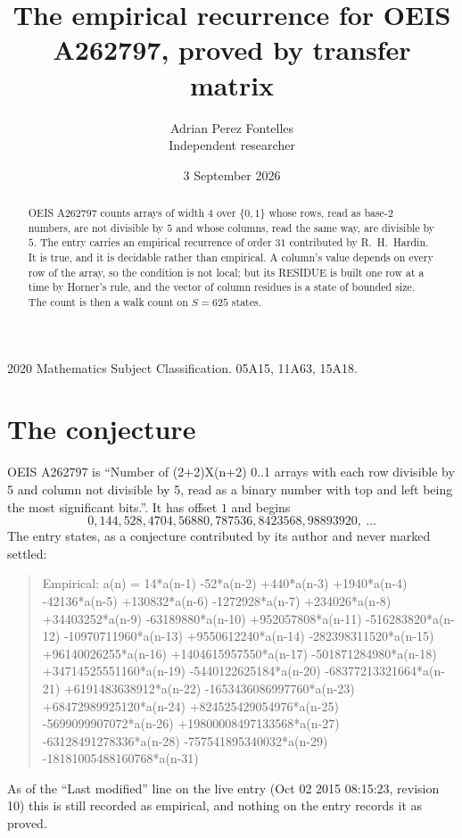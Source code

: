 \documentclass[11pt,a4paper]{article}
\title{The empirical recurrence for OEIS A262797, proved by transfer matrix}
\author{Adrian Perez Fontelles\\ \small Independent researcher}
\date{3 September 2026}
\theoremstyle{plain}
\theoremstyle{definition}
\begin{document}
\maketitle

\begin{abstract}
OEIS A262797 counts arrays of width $4$ over $\{0,1\}$ whose rows, read as base-$2$
numbers, are not divisible by $5$ and whose columns, read the same way, are divisible by
$5$. The entry carries an empirical recurrence of order $31$ contributed by
R.~H.~Hardin. It is true, and it is decidable rather than empirical. A column's value depends on
every row of the array, so the condition is not local; but its RESIDUE is built one row at a
time by Horner's rule, and the vector of column residues is a state of bounded size. The count
is then a walk count on $S=625$ states.
\end{abstract}

\noindent\small 2020 Mathematics Subject Classification. 05A15, 11A63, 15A18.\normalsize

\section{The conjecture}

OEIS A262797 is ``Number of (2+2)X(n+2) 0..1 arrays with each row divisible by 5 and column not divisible by 5, read as a binary number with top and left being the most significant bits.''. It has offset $1$ and begins
\[
0, 144, 528, 4704, 56880, 787536, 8423568, 98893920,\ \dots
\]
The entry states, as a conjecture contributed by its author and never marked settled:
\begin{quote}
Empirical: a(n) = 14*a(n-1) -52*a(n-2) +440*a(n-3) +1940*a(n-4) -42136*a(n-5) +130832*a(n-6) -1272928*a(n-7) +234026*a(n-8) +34403252*a(n-9) -63189880*a(n-10) +952057808*a(n-11) -516283820*a(n-12) -10970711960*a(n-13) +9550612240*a(n-14) -282398311520*a(n-15) +96140026255*a(n-16) +1404615957550*a(n-17) -501871284980*a(n-18) +34714525551160*a(n-19) -5440122625184*a(n-20) -68377213321664*a(n-21) +6191483638912*a(n-22) -1653436086997760*a(n-23) +68472989925120*a(n-24) +824525429054976*a(n-25) -5699099907072*a(n-26) +19800008497133568*a(n-27) -63128491278336*a(n-28) -757541895340032*a(n-29) -18181005488160768*a(n-31)
\end{quote}
As of the ``Last modified'' line on the live entry (Oct 02 2015 08:15:23, revision 10) this is still
recorded as empirical, and nothing on the entry records it as proved.
\end{document}
